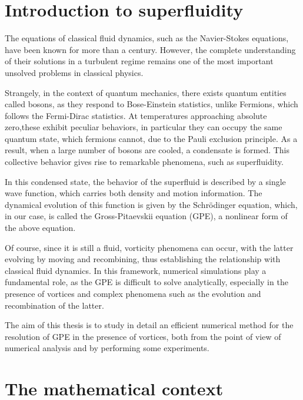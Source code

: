 \section{Introduction to superfluidity}

The equations of classical fluid dynamics, such as the Navier-Stokes equations, have been known for more than a century. However, the complete understanding of their solutions in a turbulent regime remains one of the most important unsolved problems in classical physics.

\medskip

Strangely, in the context of quantum mechanics, there exists quantum entities called bosons, as they respond to Bose-Einstein statistics, unlike Fermions, which follows the Fermi-Dirac statistics. At temperatures approaching absolute zero,these exhibit peculiar behaviors, in particular they can occupy the same quantum state, which fermions cannot, due to the Pauli exclusion principle. As a result, when a large number of bosons are cooled, a condensate is formed. This collective behavior gives rise to remarkable phenomena, such as superfluidity.

\medskip

In this condensed state, the behavior of the superfluid is described by a single wave function, which carries both density and motion information. The dynamical evolution of this function is given by the Schrödinger equation, which, in our case, is called the Gross-Pitaevskii equation (GPE), a nonlinear form of the above equation.

Of course, since it is still a fluid, vorticity phenomena can occur, with the latter evolving by moving and recombining, thus establishing the relationship with classical fluid dynamics. In this framework, numerical simulations play a fundamental role, as the GPE is difficult to solve analytically, especially in the presence of vortices and complex phenomena such as the evolution and recombination of the latter. 

\medskip

The aim of this thesis is to study in detail an efficient numerical method for the resolution of GPE in the presence of vortices, both from the point of view of numerical analysis and by performing some experiments. 

\newpage

\section{The mathematical context}

